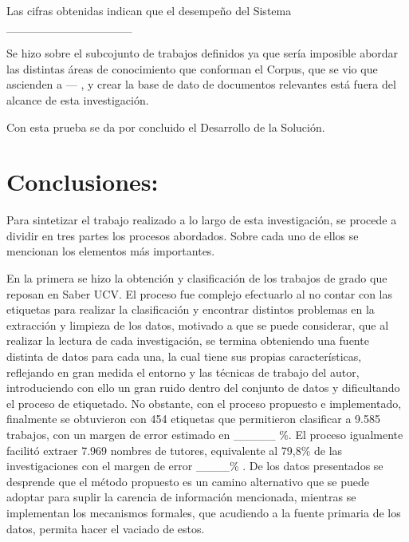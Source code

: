 \documentclass[
  12pt,
  openany]{book}
\begin{document}
Las cifras obtenidas indican que el desempeño del Sistema \_\_\_\_\_\_\_\_\_\_\_\_\_\_\_

Se hizo sobre el subcojunto de trabajos definidos ya que sería imposible abordar las distintas áreas de conocimiento que conforman el Corpus, que se vio que ascienden a --- , y crear la base de dato de documentos relevantes está fuera del alcance de esta investigación.

Con esta prueba se da por concluido el Desarrollo de la Solución.

\hypertarget{conclusiones}{%
\chapter{Conclusiones:}\label{conclusiones}}

Para sintetizar el trabajo realizado a lo largo de esta investigación, se procede a dividir en tres partes los procesos abordados. Sobre cada uno de ellos se mencionan los elementos más importantes.

En la primera se hizo la obtención y clasificación de los trabajos de grado que reposan en Saber UCV. El proceso fue complejo efectuarlo al no contar con las etiquetas para realizar la clasificación y encontrar distintos problemas en la extracción y limpieza de los datos, motivado a que se puede considerar, que al realizar la lectura de cada investigación, se termina obteniendo una fuente distinta de datos para cada una, la cual tiene sus propias características, reflejando en gran medida el entorno y las técnicas de trabajo del autor, introduciendo con ello un gran ruido dentro del conjunto de datos y dificultando el proceso de etiquetado. No obstante, con el proceso propuesto e implementado, finalmente se obtuvieron con 454 etiquetas que permitieron clasificar a 9.585 trabajos, con un margen de error estimado en \_\_\_\_\_ \%. El proceso igualmente facilitó extraer 7.969 nombres de tutores, equivalente al 79,8\% de las investigaciones con el margen de error \_\_\_\_\% . De los datos presentados se desprende que el método propuesto es un camino alternativo que se puede adoptar para suplir la carencia de información mencionada, mientras se implementan los mecanismos formales, que acudiendo a la fuente primaria de los datos, permita hacer el vaciado de estos.
\end{document}
